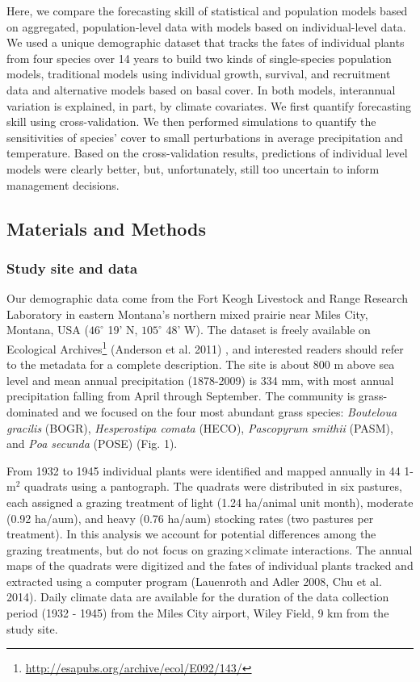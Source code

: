 \documentclass[12pt,]{article}
\let\rmarkdownfootnote\footnote%
\def\footnote{\protect\rmarkdownfootnote}
\begin{document}
Here, we compare the forecasting skill of statistical and population
models based on aggregated, population-level data with models based on
individual-level data. We used a unique demographic dataset that tracks
the fates of individual plants from four species over 14 years to build
two kinds of single-species population models, traditional models using
individual growth, survival, and recruitment data and alternative models
based on basal cover. In both models, interannual variation is
explained, in part, by climate covariates. We first quantify forecasting
skill using cross-validation. We then performed simulations to quantify
the sensitivities of species' cover to small perturbations in average
precipitation and temperature. Based on the cross-validation results,
predictions of individual level models were clearly better, but,
unfortunately, still too uncertain to inform management decisions.

\subsection{Materials and Methods}\label{materials-and-methods}

\subsubsection{Study site and data}\label{study-site-and-data}

Our demographic data come from the Fort Keogh Livestock and Range
Research Laboratory in eastern Montana's northern mixed prairie near
Miles City, Montana, USA (\(46^{\circ}\) 19' N, \(105^{\circ}\) 48' W).
The dataset is freely available on Ecological Archives\footnote{\url{http://esapubs.org/archive/ecol/E092/143/}}
(Anderson et al. 2011) , and interested readers should refer to the
metadata for a complete description. The site is about 800 m above sea
level and mean annual precipitation (1878-2009) is 334 mm, with most
annual precipitation falling from April through September. The community
is grass-dominated and we focused on the four most abundant grass
species: \emph{Bouteloua gracilis} (BOGR), \emph{Hesperostipa comata}
(HECO), \emph{Pascopyrum smithii} (PASM), and \emph{Poa secunda} (POSE)
(Fig. 1).

From 1932 to 1945 individual plants were identified and mapped annually
in 44 1-\(\text{m}^2\) quadrats using a pantograph. The quadrats were
distributed in six pastures, each assigned a grazing treatment of light
(1.24 ha/animal unit month), moderate (0.92 ha/aum), and heavy (0.76
ha/aum) stocking rates (two pastures per treatment). In this analysis we
account for potential differences among the grazing treatments, but do
not focus on grazing\(\times\)climate interactions. The annual maps of
the quadrats were digitized and the fates of individual plants tracked
and extracted using a computer program (Lauenroth and Adler 2008, Chu et
al. 2014). Daily climate data are available for the duration of the data
collection period (1932 - 1945) from the Miles City airport, Wiley
Field, 9 km from the study site.
\end{document}
